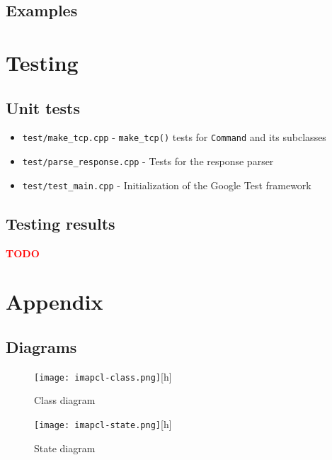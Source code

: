 \documentclass[a4]{report}
\newcommand{\TODO}{
    \textbf{\textcolor{red}{TODO}}
}
\begin{document}
\section{Examples}

\chapter{Testing}

\section{Unit tests}

\begin{itemize}
\item \texttt{test/make\_tcp.cpp} - \texttt{make\_tcp()} tests for \texttt{Command} and its subclasses
\item \texttt{test/parse\_response.cpp} - Tests for the response parser
\item \texttt{test/test\_main.cpp} - Initialization of the Google Test framework
\end{itemize}

\section{Testing results}

\TODO

\chapter{Appendix}

\section{Diagrams}

\begin{figure}
  \centering
  \texttt{[image: imapcl-class.png]}[h]
  \caption{Class diagram}
  \label{class}
\end{figure}

\begin{figure}
  \centering
  \texttt{[image: imapcl-state.png]}[h]
  \caption{State diagram}
  \label{state}
\end{figure}

\printbibliography
\end{document}
